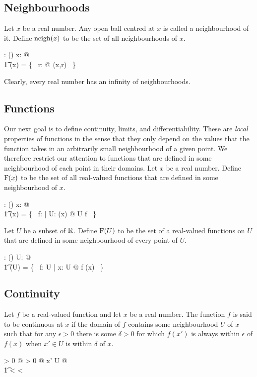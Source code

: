 \documentclass[11pt, oneside]{article}
\begin{document}
\subsection{Neighbourhoods}

Let $x$ be a real number.
Any open ball centred at $x$ is called a neighbourhood of it.
Define $\operatorname{neigh}(x)$ to be the set of all neighbourhoods of $x$.

\begin{axdef}
	\neighR: \R \fun \power (\power \R)
\where
	\forall x: \R @ \\
	\t1	\neighR(x) = \{~ r: \Rpos @ \ballRR(x,r) ~\}
\end{axdef}
Clearly, every real number has an infinity of neighbourhoods.

\subsection{Functions}

Our next goal is to define continuity, limits, and differentiability.
These are {\it local} properties of functions
in the sense that they only depend on the values that the function takes in an arbitrarily small neighbourhood of a given point.
We therefore restrict our attention to functions that are defined in some neighbourhood of each point in their domains.
Let $x$ be a real number. 
Define $\operatorname{F}(x)$ to be the set of all real-valued functions that are defined in some neighbourhood of $x$.
\begin{axdef}
	\FunR: \R \fun \power(\R \pfun \R)
\where
	\forall x: \R @ \\
	\t1	\FunR(x) = \{~ f: \R \pfun \R | \exists U: \neighR(x) @ U \subseteq \dom f ~\}
\end{axdef}

Let $U$ be a subset of $\mathbb{R}$.
Define $\operatorname{F}(U)$ to be the set of a real-valued functions on $U$ that are defined in some neighbourhood of every point of $U$.
\begin{axdef}
	\FunPR: \power \R \fun \power (\R \pfun \R)
\where
	\forall U: \power \R @ \\
	\t1	\FunPR(U) = \{~ f: U \fun \R | \forall x: U @ f \in \FunR(x) ~\}
\end{axdef}

\subsection{Continuity}

Let $f$ be a real-valued function and 
let $x$ be a real number.
The function $f$ is said to be continuous at $x$ if 
the domain of $f$ contains some neighbourhood $U$ of $x$ such that
for any $\epsilon > 0$ there is some $\delta > 0$ for which 
$f(x')$ is always within $\epsilon$ of $f(x)$
when $x' \in U$ is within $\delta$ of $x$.
\begin{argue}
\forall \epsilon > 0 @ \exists \delta > 0 @ \forall x' \in U @ \\
\t1	 < \delta \implies {} < \epsilon
\end{argue}
\end{document}
